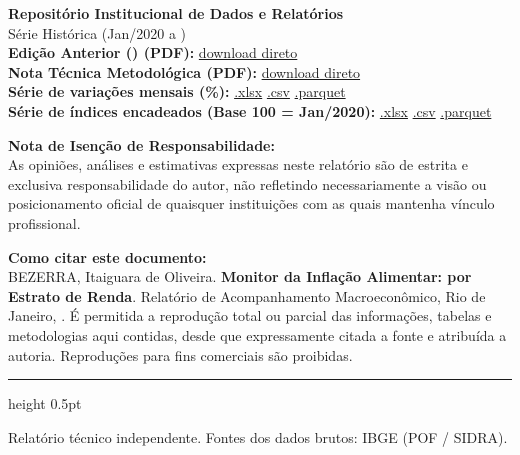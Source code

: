 \documentclass[10pt,a4paper]{article}
\begin{document}
	\vspace{0.06cm}
	
	\begin{tcolorbox}[downloadbox]
		\centering
		{\bfseries \color{bisnavy} Repositório Institucional de Dados e Relatórios}\\[2pt]
		{\footnotesize \color{secondary} Série Histórica (Jan/2020 a )}\\[5pt]
		
		{\small
			\textbf{Edição Anterior () (PDF):} \href{\VAR{link_edicao_anterior}}{download direto}\\[4pt]
			\textbf{Nota Técnica Metodológica (PDF):} \href{\VAR{link_drive_nota}}{download direto}\\[4pt]
			\textbf{Série de variações mensais (\%):} \href{\VAR{link_drive_xlsx_var}}{.xlsx} \quad\textbar\quad \href{\VAR{link_drive_csv_var}}{.csv} \quad\textbar\quad \href{\VAR{link_drive_parquet_var}}{.parquet}\\[3pt]
			\textbf{Série de índices encadeados (Base 100 = Jan/2020):} \href{\VAR{link_drive_xlsx_ind}}{.xlsx} \quad\textbar\quad \href{\VAR{link_drive_csv_ind}}{.csv} \quad\textbar\quad \href{\VAR{link_drive_parquet_ind}}{.parquet}
		}
	\end{tcolorbox}
	
	\vspace{0.10cm}
	
	\begin{tcolorbox}[notabox]
		{\bfseries \color{bisnavy} Nota de Isenção de Responsabilidade:}\\[2pt]
		{\footnotesize \color{secondary} As opiniões, análises e estimativas expressas neste relatório são de estrita e exclusiva responsabilidade do autor, não refletindo necessariamente a visão ou posicionamento oficial de quaisquer instituições com as quais mantenha vínculo profissional.}
	\end{tcolorbox}
	
	\vspace{0.08cm}
	
	\begin{tcolorbox}[notabox]
		{\bfseries \color{bisnavy} Como citar este documento:}\\[2pt]
		{\footnotesize \color{secondary} BEZERRA, Itaiguara de Oliveira. \textbf{Monitor da Inflação Alimentar: por Estrato de Renda}. Relatório de Acompanhamento Macroeconômico, Rio de Janeiro, . É permitida a reprodução total ou parcial das informações, tabelas e metodologias aqui contidas, desde que expressamente citada a fonte e atribuída a autoria. Reproduções para fins comerciais são proibidas.}
	\end{tcolorbox}
	
	\vspace{0.10cm}
	{\color{rulecolor}\hrule height 0.5pt}
	\vspace{2pt}
	{\tiny \color{secondary} Relatório técnico independente. Fontes dos dados brutos: IBGE (POF / SIDRA).}
	
\end{document}
